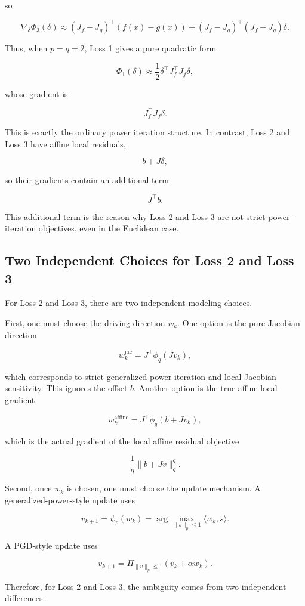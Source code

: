 \documentclass{article}
\begin{document}
so

\[
\nabla_\delta \Phi_3(\delta)
\approx
(J_f-J_g)^\top(f(x)-g(x))
+
(J_f-J_g)^\top(J_f-J_g)\delta.
\]

Thus, when \(p=q=2\), Loss 1 gives a pure quadratic form

\[
\Phi_1(\delta)
\approx
\frac{1}{2}
\delta^\top J_f^\top J_f\delta,
\]

whose gradient is

\[
J_f^\top J_f\delta.
\]

This is exactly the ordinary power iteration structure. In contrast, Loss 2 and Loss 3 have affine local residuals,

\[
b+J\delta,
\]

so their gradients contain an additional term

\[
J^\top b.
\]

This additional term is the reason why Loss 2 and Loss 3 are not strict power-iteration objectives, even in the Euclidean case.

\subsection{Two Independent Choices for Loss 2 and Loss 3}

For Loss 2 and Loss 3, there are two independent modeling choices.

First, one must choose the driving direction \(w_k\). One option is the pure Jacobian direction

\[
w_k^{\mathrm{jac}}
=
J^\top\phi_q(Jv_k),
\]

which corresponds to strict generalized power iteration and local Jacobian sensitivity. This ignores the offset \(b\). Another option is the true affine local gradient

\[
w_k^{\mathrm{affine}}
=
J^\top\phi_q(b+Jv_k),
\]

which is the actual gradient of the local affine residual objective

\[
\frac{1}{q}\|b+Jv\|_q^q.
\]

Second, once \(w_k\) is chosen, one must choose the update mechanism. A generalized-power-style update uses

\[
v_{k+1}
=
\psi_p(w_k)
=
\arg\max_{\|s\|_p\le1}
\langle w_k,s\rangle.
\]

A PGD-style update uses

\[
v_{k+1}
=
\Pi_{\|v\|_p\le1}
\left(
v_k+\alpha w_k
\right).
\]

Therefore, for Loss 2 and Loss 3, the ambiguity comes from two independent differences:
\end{document}
